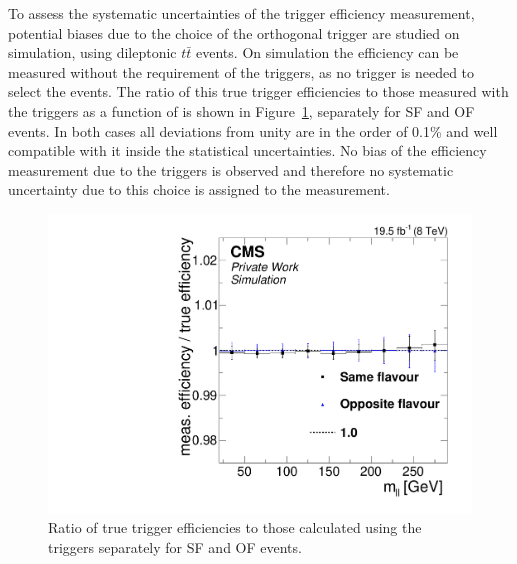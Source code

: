 To assess the systematic uncertainties of the trigger efficiency measurement, potential biases due to the choice of the orthogonal trigger  are studied on simulation, using dileptonic $t\bar{t}$ events. On simulation the efficiency can be measured without the requirement of the \HT triggers, as no trigger is needed to select the events. The ratio of this true trigger efficiencies to those measured with the \HT triggers as a function of \mll is shown in Figure~\ref{fig:triggerEffBias}, separately for SF and OF events. In both cases all deviations from unity are in the order of 0.1\% and well compatible with it inside the statistical uncertainties. No bias of the efficiency measurement due to the \HT triggers is observed and therefore no systematic uncertainty due to this choice is assigned to the measurement.
\begin{figure}
\begin{center}
\includegraphics[scale=0.35]{plots/BG/trigger/Triggereff_AlphaTSyst_PFHT_HighHTExclusive_Full2012_Mll_None.pdf}
\caption{Ratio of true trigger efficiencies to those calculated using the \HT triggers separately for SF and OF events.}
\label{fig:triggerEffBias}
\end{center}
\end{figure}

